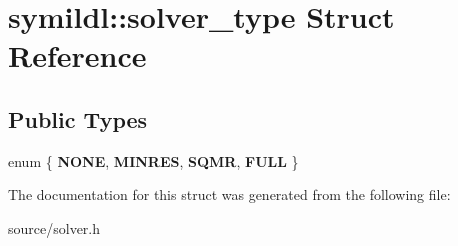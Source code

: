 \hypertarget{structsymildl_1_1solver__type}{}\section{symildl\+:\+:solver\+\_\+type Struct Reference}
\label{structsymildl_1_1solver__type}
\subsection*{Public Types}
\begin{DoxyCompactItemize}
\item 
enum \{ {\bfseries N\+O\+NE}, 
{\bfseries M\+I\+N\+R\+ES}, 
{\bfseries S\+Q\+MR}, 
{\bfseries F\+U\+LL}
 \}\hypertarget{structsymildl_1_1solver__type_a1b77d8f7357d2fbea70ecaaab604a9d6}{}\label{structsymildl_1_1solver__type_a1b77d8f7357d2fbea70ecaaab604a9d6}

\end{DoxyCompactItemize}


The documentation for this struct was generated from the following file\+:\begin{DoxyCompactItemize}
\item 
source/solver.\+h\end{DoxyCompactItemize}
